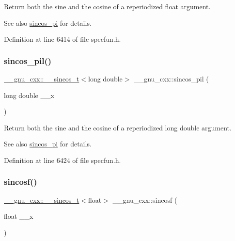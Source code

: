 Return both the sine and the cosine of a reperiodized {\ttfamily float} argument.

\begin{DoxySeeAlso}{See also}
\hyperlink{group__gnu__math__spec__func_ga6553883f127ea0de67041c3128e03813}{sincos\+\_\+pi} for details. 
\end{DoxySeeAlso}


Definition at line 6414 of file specfun.\+h.

\mbox{\label{group__gnu__math__spec__func_ga1f1efc07313a3de1e994d89c3b83b957}} 
\subsubsection{\texorpdfstring{sincos\+\_\+pil()}{sincos\_pil()}}
{\footnotesize\ttfamily \hyperlink{struct____gnu__cxx_1_1____sincos__t}{\+\_\+\+\_\+gnu\+\_\+cxx\+::\+\_\+\+\_\+sincos\+\_\+t}$<$long double$>$ \+\_\+\+\_\+gnu\+\_\+cxx\+::sincos\+\_\+pil (\begin{DoxyParamCaption}\item[{long double}]{\+\_\+\+\_\+x }\end{DoxyParamCaption})\hspace{0.3cm}{\ttfamily [inline]}}

Return both the sine and the cosine of a reperiodized {\ttfamily  long double } argument.

\begin{DoxySeeAlso}{See also}
\hyperlink{group__gnu__math__spec__func_ga6553883f127ea0de67041c3128e03813}{sincos\+\_\+pi} for details. 
\end{DoxySeeAlso}


Definition at line 6424 of file specfun.\+h.

\mbox{\label{group__gnu__math__spec__func_ga3929d13e38535418cd24db5cee80660c}} 
\subsubsection{\texorpdfstring{sincosf()}{sincosf()}}
{\footnotesize\ttfamily \hyperlink{struct____gnu__cxx_1_1____sincos__t}{\+\_\+\+\_\+gnu\+\_\+cxx\+::\+\_\+\+\_\+sincos\+\_\+t}$<$float$>$ \+\_\+\+\_\+gnu\+\_\+cxx\+::sincosf (\begin{DoxyParamCaption}\item[{float}]{\+\_\+\+\_\+x }\end{DoxyParamCaption})\hspace{0.3cm}{\ttfamily [inline]}}

